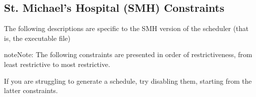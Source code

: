 \documentclass[letterpaper,10pt,english]{sphinxmanual}
\begin{document}
\begin{figure}[H]
\centering

\end{figure}


\subsection{St. Michael’s Hospital (SMH) Constraints}
\label{\detokenize{manual:st-michael-s-hospital-smh-constraints}}
The following descriptions are specific to the SMH version of the
scheduler (that is, the  executable file)

\begin{sphinxadmonition}{note}{Note:}
The following constraints are presented in order of restrictiveness,
from least restrictive to most restrictive.

If you are struggling to generate a schedule, try disabling them,
starting from the latter constraints.
\end{sphinxadmonition}
\end{document}
